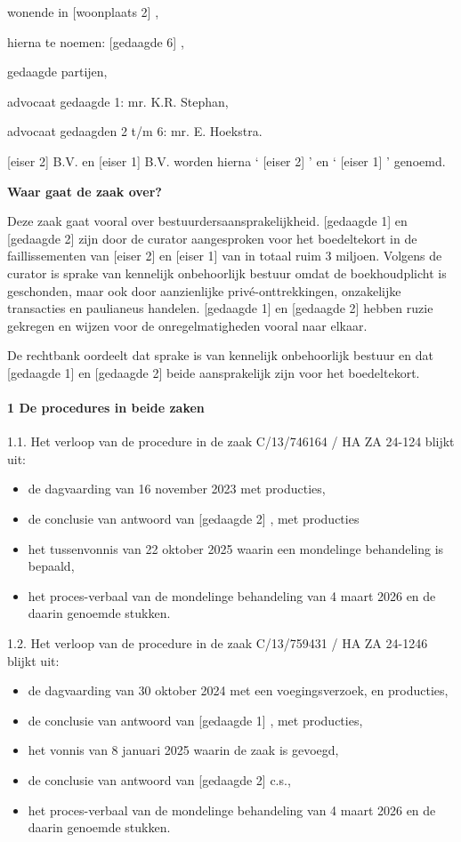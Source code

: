 \documentclass[
  dutch,
  a4paper,
]{article}
\begin{document}
wonende in {[}woonplaats 2{]} ,

hierna te noemen: {[}gedaagde 6{]} ,

gedaagde partijen,

advocaat gedaagde 1: mr. K.R. Stephan,

advocaat gedaagden 2 t/m 6: mr. E. Hoekstra.

{[}eiser 2{]} B.V. en {[}eiser 1{]} B.V. worden hierna ` {[}eiser 2{]} ' en ` {[}eiser 1{]} ' genoemd.

\textbf{Waar gaat de zaak over?}

Deze zaak gaat vooral over bestuurdersaansprakelijkheid. {[}gedaagde 1{]} en {[}gedaagde 2{]} zijn door de curator aangesproken voor het boedeltekort in de faillissementen van {[}eiser 2{]} en {[}eiser 1{]} van in totaal ruim 3 miljoen. Volgens de curator is sprake van kennelijk onbehoorlijk bestuur omdat de boekhoudplicht is geschonden, maar ook door aanzienlijke privé-onttrekkingen, onzakelijke transacties en paulianeus handelen. {[}gedaagde 1{]} en {[}gedaagde 2{]} hebben ruzie gekregen en wijzen voor de onregelmatigheden vooral naar elkaar.

De rechtbank oordeelt dat sprake is van kennelijk onbehoorlijk bestuur en dat {[}gedaagde 1{]} en {[}gedaagde 2{]} beide aansprakelijk zijn voor het boedeltekort.

\paragraph{1 De procedures in beide zaken}\label{de-procedures-in-beide-zaken}

1.1. Het verloop van de procedure in de zaak C/13/746164 / HA ZA 24-124 blijkt uit:

\begin{itemize}
\item
  de dagvaarding van 16 november 2023 met producties,
\item
  de conclusie van antwoord van {[}gedaagde 2{]} , met producties
\item
  het tussenvonnis van 22 oktober 2025 waarin een mondelinge behandeling is bepaald,
\item
  het proces-verbaal van de mondelinge behandeling van 4 maart 2026 en de daarin genoemde stukken.
\end{itemize}

1.2. Het verloop van de procedure in de zaak C/13/759431 / HA ZA 24-1246 blijkt uit:

\begin{itemize}
\item
  de dagvaarding van 30 oktober 2024 met een voegingsverzoek, en producties,
\item
  de conclusie van antwoord van {[}gedaagde 1{]} , met producties,
\item
  het vonnis van 8 januari 2025 waarin de zaak is gevoegd,
\item
  de conclusie van antwoord van {[}gedaagde 2{]} c.s.,
\item
  het proces-verbaal van de mondelinge behandeling van 4 maart 2026 en de daarin genoemde stukken.
\end{itemize}
\end{document}
